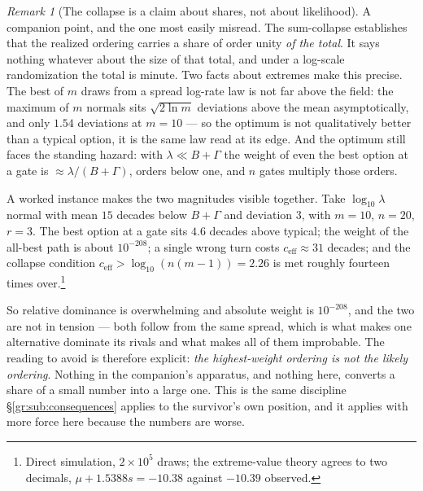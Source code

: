 \documentclass[11pt]{article}
\numberwithin{equation}{section}
\theoremstyle{plain}
\theoremstyle{definition}
\theoremstyle{remark}
\newtheorem{remark}[theorem]{Remark}
\begin{document}
\begin{remark}[The collapse is a claim about shares, not about
likelihood]\label{sch:rem:absolute}
A companion point, and the one most easily misread. The sum-collapse
establishes that the realized ordering carries a share of order unity
\emph{of the total}. It says nothing whatever about the size of that
total, and under a log-scale randomization the total is minute. Two facts about extremes make this precise. The best of $m$ draws from a
spread log-rate law is not far above the field: the maximum of $m$
normals sits $\sqrt{2\ln m}$ deviations above the mean asymptotically,
and only $1.54$ deviations at $m=10$ --- so the optimum is not
qualitatively better than a typical option, it is the same law read at
its edge. And the optimum still faces the standing hazard: with
$\lambda\ll B+\Gamma$ the weight of even the best option at a gate is
$\approx\lambda/(B+\Gamma)$, orders below one, and $n$ gates multiply
those orders.

A worked instance makes the two magnitudes visible together. Take
$\log_{10}\lambda$ normal with mean $15$ decades below $B+\Gamma$ and
deviation $3$, with $m=10$, $n=20$, $r=3$. The best option at a gate
sits $4.6$ decades above typical; the weight of the all-best path is
about $10^{-208}$; a single wrong turn costs $c_{\mathrm{eff}}\approx31$
decades; and the collapse condition $c_{\mathrm{eff}}>\log_{10}(n(m-1))
=2.26$ is met roughly fourteen times over.\footnote{Direct simulation,
$2\times10^{5}$ draws; the extreme-value theory agrees to two decimals,
$\mu+1.5388s=-10.38$ against $-10.39$ observed.}

So relative dominance is overwhelming and absolute weight is
$10^{-208}$, and the two are not in tension --- both follow from the
same spread, which is what makes one alternative dominate its rivals and
what makes all of them improbable. The reading to avoid is therefore
explicit: \emph{the highest-weight ordering is not the likely ordering}.
Nothing in the companion's apparatus, and nothing here, converts a share
of a small number into a large one. This is the same discipline
\S\ref{gr:sub:consequences} applies to the survivor's own position, and
it applies with more force here because the numbers are worse.
\end{remark}
\end{document}
